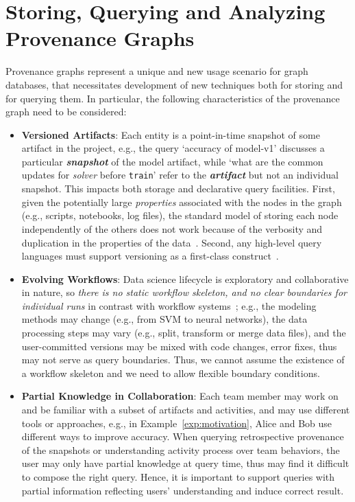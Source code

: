 \documentclass[11pt]{article}
\newcommand{\cmd}[1]{{\tt #1}}
\begin{document}
\section{Storing, Querying and Analyzing Provenance Graphs}
\label{sec:query}
Provenance graphs represent a unique and new usage scenario for graph databases, that necessitates development of new techniques both for storing and for querying
them.  In particular, the following characteristics of the provenance graph need to be considered:
\begin{itemize}
\item \textbf{Versioned Artifacts}: Each entity is a point-in-time snapshot of
some artifact in the project, e.g., the query `accuracy of model-v1' discusses a
particular \textbf{\emph{snapshot}} of the model artifact, while `what are the
common updates for \emph{solver} before \cmd{train}' refer to the
\textbf{\emph{artifact}} but not an individual snapshot. This impacts both
storage and declarative query facilities. First, given the potentially large
{\em properties} associated with the nodes in the graph (e.g., scripts,
notebooks, log files), the standard model of storing each node
independently of the others does not work because of the verbosity
and duplication in the properties of the data~\cite{dda_microsoft@cidr17}.
Second, any high-level query languages must support versioning as a first-class
construct~\cite{provenance2015}.

\item \textbf{Evolving Workflows}: Data science lifecycle is exploratory and
collaborative in nature, so \emph{there is no static workflow skeleton, and no
clear boundaries for individual runs} in contrast with workflow
systems~\cite{freire2008provenance}; e.g., the modeling methods may change
(e.g., from SVM to neural networks), the data processing steps may vary (e.g.,
split, transform or merge data files), and the user-committed versions may be
mixed with code changes, error fixes, thus may not serve as query boundaries.
Thus, we cannot assume the existence of a workflow skeleton and we need to allow
flexible boundary conditions.

\item \textbf{Partial Knowledge in Collaboration}: Each team member may work on
and be familiar with a subset of artifacts and activities, and may use different
tools or approaches, e.g., in Example~\ref{exp:motivation}, Alice and Bob use
different ways to improve accuracy.  When querying retrospective provenance of
the snapshots or understanding activity process over team behaviors, the user
may only have partial knowledge at query time, thus may find it difficult to
compose the right query. Hence, it is important to support queries with partial
information reflecting users' understanding and induce correct result. 


\end{itemize}
\end{document}
